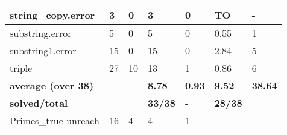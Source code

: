 \begin{table}
{\begin{tabular}{|l|l|l|l|l|l|l|}
    string\_copy.error                                       & 3                                     & 0                                          & 3                                     & 0                                          & TO                                                              & -                                        \\ \hline
    substring.error                                          & 5                                     & 0                                          & 5                                     & 0                                          & 0.55                                                            & 1                                        \\ \hline
    substring1.error                                         & 15                                    & 0                                          & 15                                    & 0                                          & 2.84                                                            & 5                                        \\ \hline
    triple                                                   & 27                                    & 10                                         & 13                                    & 1                                          & 0.86                                                            & 6                                        \\ \hline
    \hline    \textbf{average (over 38)} & ~                                     & ~                                          & \textbf{8.78}              & \textbf{0.93}                   & \textbf{9.52}                                        & \textbf{38.64}                \\ \hline
    \textbf{solved/total}                         & ~                                     & ~                                          & \textbf{33/38}             & -                                          & \textbf{28/38}                                       & ~                                        \\ \hline
    \hline    Primes\_true-unreach                  & 16                                    & 4                                          & 4                                     & 1                                          & ~                                                               & ~                                        \\ \hline

\end{tabular}}
\end{table}
